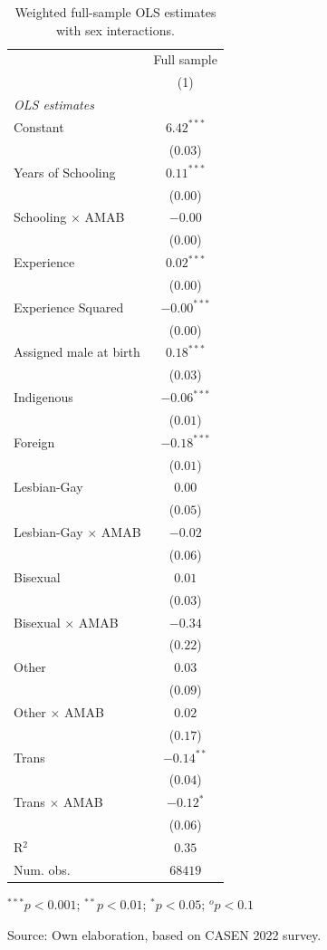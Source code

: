 \begin{table}[H]
\begin{center}
\begin{threeparttable}
\captionsetup{margin=0.5cm}
\caption{Weighted full-sample OLS estimates with sex interactions.}
\label{tab:MCO_CASEN_1col}
\footnotesize
\centering
\begin{tabular}{lc}
\toprule
 & \multicolumn{1}{c}{Full sample} \\ 
 & (1) \\ \midrule
\textit{OLS estimates} &  \\ 
Constant & $6.42^{***}$ \\ 
 & ($0.03$) \\ 
Years of Schooling & $0.11^{***}$ \\ 
 & ($0.00$) \\ 
Schooling $\times$ AMAB & $-0.00$ \\ 
 & ($0.00$) \\ 
Experience & $0.02^{***}$ \\ 
 & ($0.00$) \\ 
Experience Squared & $-0.00^{***}$ \\ 
 & ($0.00$) \\ 
Assigned male at birth & $0.18^{***}$ \\ 
 & ($0.03$) \\ 
Indigenous & $-0.06^{***}$ \\ 
 & ($0.01$) \\ 
Foreign & $-0.18^{***}$ \\ 
 & ($0.01$) \\ 
Lesbian-Gay & $0.00$ \\ 
 & ($0.05$) \\ 
Lesbian-Gay $\times$ AMAB & $-0.02$ \\ 
 & ($0.06$) \\ 
Bisexual & $0.01$ \\ 
 & ($0.03$) \\ 
Bisexual $\times$ AMAB & $-0.34$ \\ 
 & ($0.22$) \\ 
Other & $0.03$ \\ 
 & ($0.09$) \\ 
Other $\times$ AMAB & $0.02$ \\ 
 & ($0.17$) \\ 
Trans & $-0.14^{**}$ \\ 
 & ($0.04$) \\ 
Trans $\times$ AMAB & $-0.12^{*}$ \\ 
 & ($0.06$) \\ 
R$^2$ & $0.35$ \\ 
Num. obs. & $68419$ \\ \bottomrule
\end{tabular}
\begin{tablenotes}
\item ${}^{***}p<0.001$; ${}^{**}p<0.01$; ${}^{*}p<0.05$; ${}^{o}p<0.1$
\item Source: Own elaboration, based on CASEN 2022 survey.
\end{tablenotes}
\end{threeparttable}
\end{center}
\end{table}